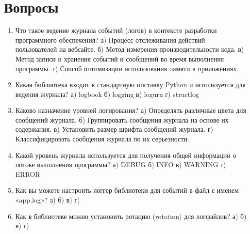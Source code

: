 \documentclass[letterpaper,10pt,russian]{sphinxmanual}
\begin{document}
\sphinxstepscope


\section{Вопросы}
\label{\detokenize{educational_materials/logging/quiz:id1}}\label{\detokenize{educational_materials/logging/quiz::doc}}\begin{enumerate}
%
\item {} 
\sphinxAtStartPar
Что такое ведение журнала событий (логов) в контексте разработки программного обеспечения?
а) Процесс отслеживания действий пользователей на веб\sphinxhyphen{}сайте.
б) Метод измерения производительности кода.
в) Метод записи и хранения событий и сообщений во время выполнения программы.
г) Способ оптимизации использования памяти в приложениях.

\item {} 
\sphinxAtStartPar
Какая библиотека входит в стандартную поставку Python и используется для ведения журнала?
а) logbook
б) logging
в) loguru
г) structlog

\item {} 
\sphinxAtStartPar
Каково назначение уровней логирования?
а) Определять различные цвета для сообщений журнала.
б) Группировать сообщения журнала на основе их содержания.
в) Установить размер шрифта сообщений журнала.
г) Классифицировать сообщения журнала по их серьезности.

\item {} 
\sphinxAtStartPar
Какой уровень журнала используется для получения общей информации о потоке выполнения программы?
а) DEBUG
б) INFO
в) WARNING
г) ERROR

\item {} 
\sphinxAtStartPar
Как вы можете настроить логгер библиотеки  для событий в файл с именем «app.log»?
а) 
б) 
в) 
г) 

\item {} 
\sphinxAtStartPar
Как в библиотеке  можно установить ротацию (rotation) для лог\sphinxhyphen{}файлов?
а) 
б) 
в) 
г) 


\end{enumerate}
\end{document}
